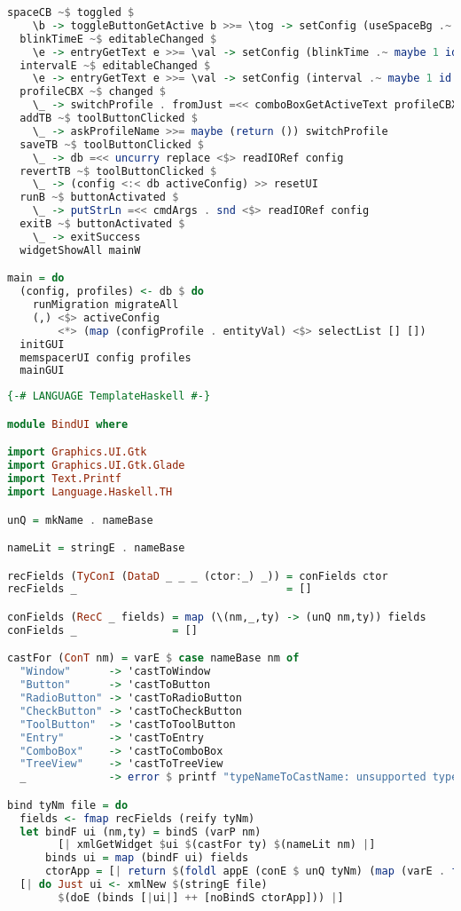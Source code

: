 \begin{lstlisting}[language=Haskell,caption=MemspacerUI.hs]
  spaceCB ~$ toggled $
    \b -> toggleButtonGetActive b >>= \tog -> setConfig (useSpaceBg .~ tog)
  blinkTimeE ~$ editableChanged $
    \e -> entryGetText e >>= \val -> setConfig (blinkTime .~ maybe 1 id (readMaybe val))
  intervalE ~$ editableChanged $
    \e -> entryGetText e >>= \val -> setConfig (interval .~ maybe 1 id (readMaybe val))
  profileCBX ~$ changed $
    \_ -> switchProfile . fromJust =<< comboBoxGetActiveText profileCBX
  addTB ~$ toolButtonClicked $
    \_ -> askProfileName >>= maybe (return ()) switchProfile
  saveTB ~$ toolButtonClicked $
    \_ -> db =<< uncurry replace <$> readIORef config
  revertTB ~$ toolButtonClicked $
    \_ -> (config <:< db activeConfig) >> resetUI
  runB ~$ buttonActivated $
    \_ -> putStrLn =<< cmdArgs . snd <$> readIORef config
  exitB ~$ buttonActivated $
    \_ -> exitSuccess
  widgetShowAll mainW

main = do
  (config, profiles) <- db $ do
    runMigration migrateAll
    (,) <$> activeConfig
        <*> (map (configProfile . entityVal) <$> selectList [] [])
  initGUI
  memspacerUI config profiles
  mainGUI
\end{lstlisting}

\begin{lstlisting}[language=Haskell,caption=BindUI.hs]
{-# LANGUAGE TemplateHaskell #-}

module BindUI where

import Graphics.UI.Gtk
import Graphics.UI.Gtk.Glade
import Text.Printf
import Language.Haskell.TH

unQ = mkName . nameBase

nameLit = stringE . nameBase

recFields (TyConI (DataD _ _ _ (ctor:_) _)) = conFields ctor
recFields _                                 = []

conFields (RecC _ fields) = map (\(nm,_,ty) -> (unQ nm,ty)) fields
conFields _               = []

castFor (ConT nm) = varE $ case nameBase nm of
  "Window"      -> 'castToWindow
  "Button"      -> 'castToButton
  "RadioButton" -> 'castToRadioButton
  "CheckButton" -> 'castToCheckButton
  "ToolButton"  -> 'castToToolButton
  "Entry"       -> 'castToEntry
  "ComboBox"    -> 'castToComboBox
  "TreeView"    -> 'castToTreeView
  _             -> error $ printf "typeNameToCastName: unsupported typename `%s'!" (show nm)

bind tyNm file = do
  fields <- fmap recFields (reify tyNm)
  let bindF ui (nm,ty) = bindS (varP nm)
        [| xmlGetWidget $ui $(castFor ty) $(nameLit nm) |]
      binds ui = map (bindF ui) fields
      ctorApp = [| return $(foldl appE (conE $ unQ tyNm) (map (varE . fst) fields)) |]
  [| do Just ui <- xmlNew $(stringE file)
        $(doE (binds [|ui|] ++ [noBindS ctorApp])) |]
\end{lstlisting}